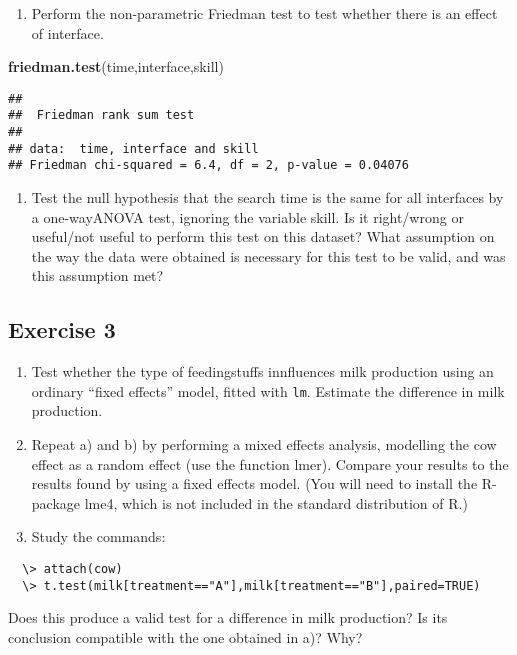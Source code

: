 \documentclass[]{article}
\newenvironment{Shaded}{\begin{snugshade}}{\end{snugshade}}
\newcommand{\KeywordTok}[1]{\textcolor[rgb]{0.13,0.29,0.53}{\textbf{#1}}}
\newcommand{\NormalTok}[1]{#1}
\providecommand{\tightlist}{%
  \setlength{\itemsep}{0pt}\setlength{\parskip}{0pt}}
\begin{document}
\begin{enumerate}
\def\labelenumi{\alph{enumi})}
\setcounter{enumi}{4}
\tightlist
\item
  Perform the non-parametric Friedman test to test whether there is an
  effect of interface.
\end{enumerate}

\begin{Shaded}
\begin{Highlighting}[]
\KeywordTok{friedman.test}\NormalTok{(time,interface,skill)}
\end{Highlighting}
\end{Shaded}

\begin{verbatim}
## 
##  Friedman rank sum test
## 
## data:  time, interface and skill
## Friedman chi-squared = 6.4, df = 2, p-value = 0.04076
\end{verbatim}

\begin{enumerate}
\def\labelenumi{\alph{enumi})}
\setcounter{enumi}{5}
\tightlist
\item
  Test the null hypothesis that the search time is the same for all
  interfaces by a one-wayANOVA test, ignoring the variable skill. Is it
  right/wrong or useful/not useful to perform this test on this dataset?
  What assumption on the way the data were obtained is necessary for
  this test to be valid, and was this assumption met?
\end{enumerate}

\hypertarget{exercise-3}{%
\subsection{Exercise 3}\label{exercise-3}}

\begin{enumerate}
\def\labelenumi{\alph{enumi})}
\item
  Test whether the type of feedingstuffs innfluences milk production
  using an ordinary ``fixed effects'' model, fitted with \texttt{lm}.
  Estimate the difference in milk production.
\item
  Repeat a) and b) by performing a mixed effects analysis, modelling the
  cow effect as a random effect (use the function lmer). Compare your
  results to the results found by using a fixed effects model. (You will
  need to install the R-package lme4, which is not included in the
  standard distribution of R.)
\item
  Study the commands:
\end{enumerate}

\begin{verbatim}
  \> attach(cow) 
  \> t.test(milk[treatment=="A"],milk[treatment=="B"],paired=TRUE)
\end{verbatim}

Does this produce a valid test for a difference in milk production? Is
its conclusion compatible with the one obtained in a)? Why?
\end{document}
